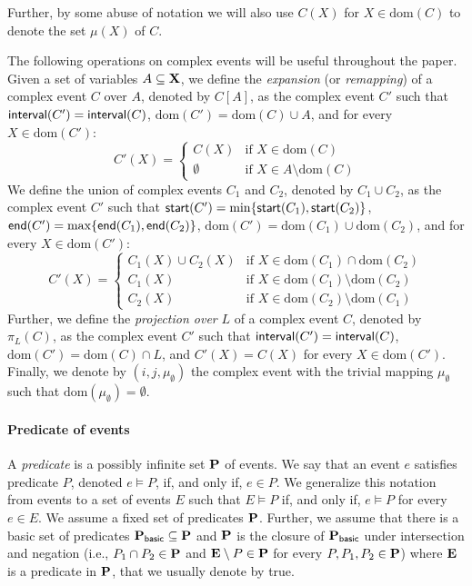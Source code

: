 Further, by some abuse of notation we will also use $C(X)$ for $X \in \text{dom}(C)$ to denote the set $\mu(X)$ of $C$.

The following operations on complex events will be useful throughout the paper. Given a set of variables $A \subseteq \mathbf{X}$, we define the \textit{expansion} (or \textit{remapping}) of a complex event $C$ over $A$, denoted by $C[A]$, as the complex event $C'$ such that $\mathsf{interval}(C') = \mathsf{interval}(C)$, $\text{dom}(C') = \text{dom}(C) \cup A$, and for every $X \in \text{dom}(C')$:
\[
C'(X) = \begin{cases} 
	C(X) & \text{if } X \in \text{dom}(C) \\
	\emptyset & \text{if } X \in A \setminus \text{dom}(C)
\end{cases}
\]
We define the union of complex events $C_1$ and $C_2$, denoted by $C_1 \cup C_2$, as the complex event $C'$ such that $\mathsf{start}(C') = \min\{\mathsf{start}(C_1), \mathsf{start}(C_2)\}$, $\mathsf{end}(C') = \max\{\mathsf{end}(C_1), \mathsf{end}(C_2)\}$, $\text{dom}(C') = \text{dom}(C_1) \cup \text{dom}(C_2)$, and for every $X \in \text{dom}(C')$:
\[
C'(X) = \begin{cases} 
	C_1(X) \cup C_2(X) & \text{if } X \in \text{dom}(C_1) \cap \text{dom}(C_2) \\
	C_1(X) & \text{if } X \in \text{dom}(C_1) \setminus \text{dom}(C_2) \\
	C_2(X) & \text{if } X \in \text{dom}(C_2) \setminus \text{dom}(C_1)
\end{cases}
\]
Further, we define the \textit{projection over} $L$ of a complex event $C$, denoted by $\pi_L(C)$, as the complex event $C'$ such that $\mathsf{interval}(C') = \mathsf{interval}(C)$, $\text{dom}(C') = \text{dom}(C) \cap L$, and $C'(X) = C(X)$ for every $X \in \text{dom}(C')$. Finally, we denote by $(i, j, \mu_\emptyset)$ the complex event with the trivial mapping $\mu_\emptyset$ such that $\text{dom}(\mu_\emptyset) = \emptyset$.

\paragraph{Predicate of events} A \textit{predicate} is a possibly infinite set $\mathbf{P}$ of events. We say that an event $e$ satisfies predicate $P$, denoted $e \vDash P$, if, and only if, $e \in P$. We generalize this notation from events to a set of events $E$ such that $E \vDash P$ if, and only if, $e \vDash P$ for every $e \in E$. We assume a fixed set of predicates $\mathbf{P}$. Further, we assume that there is a basic set of predicates $\mathbf{P}_{\mathsf{basic}} \subseteq \mathbf{P}$ and $\mathbf{P}$ is the closure of $\mathbf{P}_{\mathsf{basic}}$ under intersection and negation (i.e., $P_1 \cap P_2 \in \mathbf{P}$ and $\mathbf{E} \setminus P \in \mathbf{P}$ for every $P, P_1, P_2 \in \mathbf{P}$) where $\mathbf{E}$ is a predicate in $\mathbf{P}$, that we usually denote by true.

